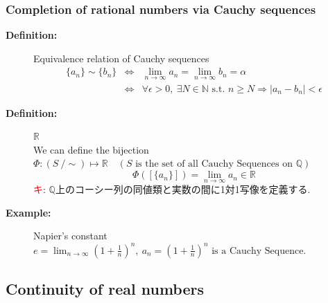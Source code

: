 \documentclass[english,dvipdfmx]{jsarticle}
\newcommand*{\point}{\textcircled{\textcolor{red}{\scriptsize キ}}}
\begin{document}
    \subsubsection{Completion of rational numbers via Cauchy sequences}
    \begin{description}
    \item[\bf{Definition:}] Equivalence relation of Cauchy sequences
        \begin{eqnarray*}
            \{ a_n \} \sim \{ b_n \} &\Leftrightarrow& \lim_{n \to \infty} a_n = \lim_{n \to \infty} b_n = \alpha \\
            &\Leftrightarrow& \forall \epsilon > 0,\ \exists N \in \mathbb{N} \text{ s.t. } n \geq N \Rightarrow | a_n - b_n | < \epsilon
        \end{eqnarray*}
    \item[\bf{Definition:}] $\mathbb{R}$ \\
        We can define the bijection $ \Phi : (S \ / \sim) \longmapsto \mathbb{R} \quad ( S \text{ is the set of all Cauchy Sequences on }\mathbb{Q} ) $
        \begin{equation*}
            \Phi( [\{ a_n \}] ) = \lim_{n \to \infty} a_n \in \mathbb{R}
        \end{equation*}
        \point : $\mathbb{Q}$上のコーシー列の同値類と実数の間に1対1写像を定義する.
        \item[\bf{Example:}] Napier's constant $e = \displaystyle \lim_{n \to \infty} ( 1 + \frac{1}{n} )^n ,\ a_n = (1 + \frac{1}{n})^n\text{ is a Cauchy Sequence.}$ 
    \end{description}
    \subsection{Continuity of real numbers}
\end{document}
